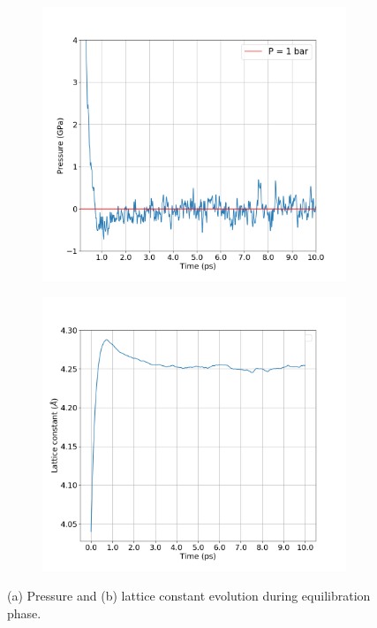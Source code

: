 \begin{figure}[!htbp]
	\begin{subfigure}[b]{0.5\textwidth}
		\includegraphics[width=\textwidth]{figs/task4-pres.png} 
		\caption{}
		\label{fig4-3a}
	\end{subfigure}%
	\begin{subfigure}[b]{0.5\textwidth}
		\includegraphics[width=\textwidth]{figs/task4-a.png} 
		\caption{}
		\label{fig4-3b}
	\end{subfigure}
	\caption{(a) Pressure and (b) lattice constant evolution during equilibration phase.}
\end{figure}

